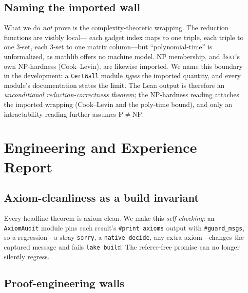 \documentclass[a4paper,UKenglish,cleveref,autoref]{lipics-v2021}
\begin{document}
\subsection{Naming the imported wall}\label{sec:wall}

What we do \emph{not} prove is the complexity-theoretic wrapping. The reduction functions are visibly local---
each gadget index maps to one triple, each triple to one 3-set, each 3-set to one matrix column---but
``polynomial-time'' is unformalized, as mathlib offers no machine model. NP membership, and \textsc{3sat}'s own
NP-hardness (Cook--Levin), are likewise imported. We name this boundary in the development: a
\lstinline{CertWall} module \emph{types} the imported quantity, and every module's documentation states the
limit. The Lean output is therefore an \emph{unconditional reduction-correctness theorem}; the NP-hardness
reading attaches the imported wrapping (Cook--Levin and the poly-time bound), and only an intractability reading
further assumes $\mathrm P \neq \mathrm{NP}$.

\section{Engineering and Experience Report}\label{sec:eng}

\subsection{Axiom-cleanliness as a build invariant}\label{sec:gate}

Every headline theorem is axiom-clean. We make this \emph{self-checking}: an \lstinline{AxiomAudit} module pins
each result's \lstinline{#print axioms} output with \lstinline{#guard_msgs}, so a regression---a stray
\lstinline{sorry}, a \lstinline{native_decide}, any extra axiom---changes the captured message and fails
\lstinline{lake build}. The referee-free promise can no longer silently regress.

\subsection{Proof-engineering walls}\label{sec:walls}
\end{document}
